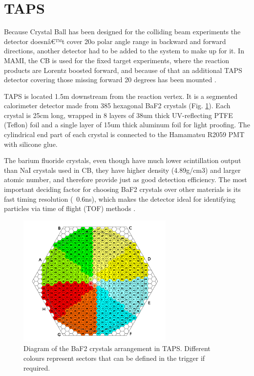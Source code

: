 \section{TAPS}

\indent Because Crystal Ball has been designed for the colliding beam experiments the detector  doesnâ€™t  cover  20o  polar  angle  range  in  backward  and  forward directions, another detector had to be added to the system to make up for it. In MAMI,  the  CB  is  used  for  the  fixed  target  experiments,  where  the  reaction products are Lorentz boosted forward, and because of that an additional TAPS detector  covering  those  missing  forward  20  degrees has  been  mounted \cite{novotny}.

\indent TAPS is located 1.5m downstream from the reaction vertex. It is a segmented calorimeter detector made from 385 hexagonal BaF2 crystals (Fig. \ref{taps}). Each crystal is  25cm long,  wrapped in  8  layers  of 38um thick  UV-reflecting PTFE (Teflon) foil and a single layer of 15um thick aluminum foil for light proofing. The cylindrical end part of each crystal is connected to the Hamamatsu R2059 PMT with silicone glue.

\indent The barium fluoride crystals, even though have much lower scintillation output than NaI crystals used in CB, they have higher density (4.89g/cm3) and larger atomic number, and therefore provide just as good detection efficiency. The most important deciding factor for choosing BaF2 crystals over other materials is its fast timing resolution (~0.6ns), which makes the detector ideal for identifying particles via time of flight (TOF) methods \cite{novotny}.


\begin{figure}[H]
\begin{center}
\includegraphics[scale=1.4]{pictures/png/taps.png}
\caption{Diagram of the BaF2 crystals arrangement in TAPS. Different colours represent sectors that can be defined in the trigger if required.}
\label{taps}
\end{center}
\end{figure} 

